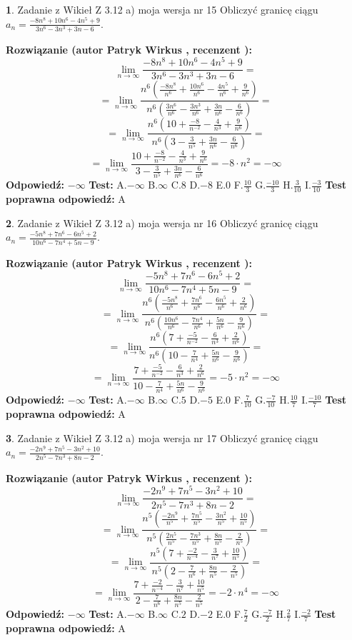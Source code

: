 \documentclass[12pt, a4paper]{article}
\theoremstyle{definition} %
\newtheorem{zad}{}
\newcommand{\zadStart}[1]{\begin{zad}#1\newline}
\newcommand{\zadStop}{\end{zad}}
\newcommand{\rozwStart}[2]{\noindent \textbf{Rozwiązanie (autor #1 , recenzent #2): }\newline}
\newcommand{\rozwStop}{\newline}
\newcommand{\odpStart}{\noindent \textbf{Odpowiedź:}\newline}
\newcommand{\odpStop}{\newline}
\newcommand{\testStart}{\noindent \textbf{Test:}\newline}
\newcommand{\testStop}{\newline}
\newcommand{\kluczStart}{\noindent \textbf{Test poprawna odpowiedź:}\newline}
\newcommand{\kluczStop}{\newline}
\begin{document}
\zadStart{Zadanie z Wikieł Z 3.12 a) moja wersja nr 15}
Obliczyć granicę ciągu $a_{n}=\frac{-8n^{8}+10n^{6}-4n^{5}+9}{3n^{6}-3n^{3}+3n-6}$.
\zadStop
\rozwStart{Patryk Wirkus}{}
$$\lim\limits_{n\to\infty}\frac{-8n^{8}+10n^{6}-4n^{5}+9}{3n^{6}-3n^{3}+3n-6}=$$
$$=\lim\limits_{n\to\infty}\frac{n^{6}\left(\frac{-8n^{8}}{n^{6}}+\frac{10n^{6}}{n^{6}}-\frac{4n^{5}}{n^{6}}+\frac{9}{n^{6}}\right)}{n^{6}\left(\frac{3n^{6}}{n^{6}}-\frac{3n^{3}}{n^{6}}+\frac{3n}{n^{6}}-\frac{6}{n^{6}}\right)}=$$
$$=\lim\limits_{n\to\infty}\frac{n^{6}\left(10+\frac{-8}{n^{-2}}-\frac{4}{n^{3}}+\frac{9}{n^{6}}\right)}
{n^{6}\left(3-\frac{3}{n^{5}}+\frac{3n}{n^{6}}-\frac{6}{n^{6}}\right)}=$$
$$=\lim\limits_{n\to\infty}\frac{10+\frac{-8}{n^{-2}}-\frac{4}{n^{3}}+\frac{9}{n^{6}}}{3-\frac{3}{n^{5}}+\frac{3n}{n^{6}}-\frac{6}{n^{6}}}=-8\cdot n^{2} = -\infty$$
\rozwStop
\odpStart
$-\infty$
\odpStop
\testStart
A.$-\infty$
B.$\infty$
C.$8$
D.$-8$
E.$0$
F.$\frac{10}{3}$
G.$\frac{-10}{3}$
H.$\frac{3}{10}$
I.$\frac{-3}{10}$
\testStop
\kluczStart
A
\kluczStop



\zadStart{Zadanie z Wikieł Z 3.12 a) moja wersja nr 16}
Obliczyć granicę ciągu $a_{n}=\frac{-5n^{8}+7n^{6}-6n^{5}+2}{10n^{6}-7n^{4}+5n-9}$.
\zadStop
\rozwStart{Patryk Wirkus}{}
$$\lim\limits_{n\to\infty}\frac{-5n^{8}+7n^{6}-6n^{5}+2}{10n^{6}-7n^{4}+5n-9}=$$
$$=\lim\limits_{n\to\infty}\frac{n^{6}\left(\frac{-5n^{8}}{n^{6}}+\frac{7n^{6}}{n^{6}}-\frac{6n^{5}}{n^{6}}+\frac{2}{n^{6}}\right)}{n^{6}\left(\frac{10n^{6}}{n^{6}}-\frac{7n^{4}}{n^{6}}+\frac{5n}{n^{6}}-\frac{9}{n^{6}}\right)}=$$
$$=\lim\limits_{n\to\infty}\frac{n^{6}\left(7+\frac{-5}{n^{-2}}-\frac{6}{n^{3}}+\frac{2}{n^{6}}\right)}
{n^{6}\left(10-\frac{7}{n^{4}}+\frac{5n}{n^{6}}-\frac{9}{n^{6}}\right)}=$$
$$=\lim\limits_{n\to\infty}\frac{7+\frac{-5}{n^{-2}}-\frac{6}{n^{3}}+\frac{2}{n^{6}}}{10-\frac{7}{n^{4}}+\frac{5n}{n^{6}}-\frac{9}{n^{6}}}=-5\cdot n^{2} = -\infty$$
\rozwStop
\odpStart
$-\infty$
\odpStop
\testStart
A.$-\infty$
B.$\infty$
C.$5$
D.$-5$
E.$0$
F.$\frac{7}{10}$
G.$\frac{-7}{10}$
H.$\frac{10}{7}$
I.$\frac{-10}{7}$
\testStop
\kluczStart
A
\kluczStop



\zadStart{Zadanie z Wikieł Z 3.12 a) moja wersja nr 17}
Obliczyć granicę ciągu $a_{n}=\frac{-2n^{9}+7n^{5}-3n^{2}+10}{2n^{5}-7n^{3}+8n-2}$.
\zadStop
\rozwStart{Patryk Wirkus}{}
$$\lim\limits_{n\to\infty}\frac{-2n^{9}+7n^{5}-3n^{2}+10}{2n^{5}-7n^{3}+8n-2}=$$
$$=\lim\limits_{n\to\infty}\frac{n^{5}\left(\frac{-2n^{9}}{n^{5}}+\frac{7n^{5}}{n^{5}}-\frac{3n^{2}}{n^{5}}+\frac{10}{n^{5}}\right)}{n^{5}\left(\frac{2n^{5}}{n^{5}}-\frac{7n^{3}}{n^{5}}+\frac{8n}{n^{5}}-\frac{2}{n^{5}}\right)}=$$
$$=\lim\limits_{n\to\infty}\frac{n^{5}\left(7+\frac{-2}{n^{-4}}-\frac{3}{n^{7}}+\frac{10}{n^{5}}\right)}
{n^{5}\left(2-\frac{7}{n^{6}}+\frac{8n}{n^{5}}-\frac{2}{n^{5}}\right)}=$$
$$=\lim\limits_{n\to\infty}\frac{7+\frac{-2}{n^{-4}}-\frac{3}{n^{7}}+\frac{10}{n^{5}}}{2-\frac{7}{n^{6}}+\frac{8n}{n^{5}}-\frac{2}{n^{5}}}=-2\cdot n^{4} = -\infty$$
\rozwStop
\odpStart
$-\infty$
\odpStop
\testStart
A.$-\infty$
B.$\infty$
C.$2$
D.$-2$
E.$0$
F.$\frac{7}{2}$
G.$\frac{-7}{2}$
H.$\frac{2}{7}$
I.$\frac{-2}{7}$
\testStop
\kluczStart
A
\kluczStop
\end{document}
